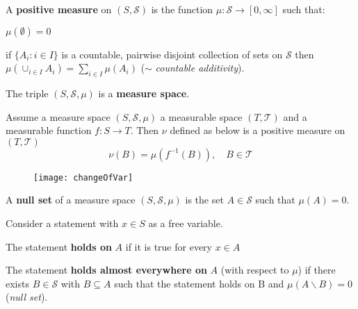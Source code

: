 \begin{definition}
A \textbf{positive measure} on $(S, \mathscr{S})$ is the function $\mu : \mathscr{S} \to [0, \infty]$ such that:
\begin{compactitem}
\item $\mu(\emptyset) = 0$
\item if $\{A_i : i \in I \}$ is a countable, pairwise disjoint collection of sets on $\mathscr{S}$ then $\mu(\cup_{i \in I} A_i) = \sum_{i \in I} \mu(A_i)$ ($\sim$ \emph{countable additivity}). 
\end{compactitem}
The triple $(S, \mathscr{S}, \mu)$ is a \textbf{measure space}.
\end{definition}

\begin{theorem}
Assume a measure space $(S, \mathscr{S}, \mu)$ a measurable space $(T, \mathscr{T})$ and a measurable function $f : S \to T$.
Then $\nu$ defined as below is a positive measure on $(T, \mathscr{T})$
\begin{equation*}
\nu(B) = \mu(f^{-1}(B)), \quad B \in \mathscr{T}
\end{equation*}
\end{theorem}

\begin{figure}[ht]
\texttt{[image: changeOfVar]}
\centering
\end{figure}

\begin{definition}
A \textbf{null set} of a measure space $(S, \mathscr{S}, \mu)$ is the set $A \in \mathscr{S}$ such that $\mu(A) = 0$.
\end{definition}

\begin{definition}
Consider a statement with $x \in S$ as a free variable.
\begin{compactitem}
\item The statement \textbf{holds on} $A$ if it is true for every $x \in A$
\item The statement \textbf{holds almost everywhere on} $A$ (with respect to $\mu$) if there exists $B \in \mathscr{S}$ with $B \subseteq A$ such that the statement holds on B and $\mu(A \backslash B) = 0$ (\emph{null set}).
\end{compactitem}
\end{definition}


